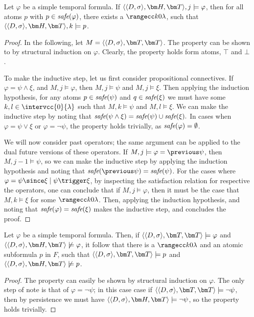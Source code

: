 \begin{lemma}\label{lemma1}
  Let $\varphi$ be a simple temporal formula. If
  $\qthandt,j \models \varphi$, then for all atoms $p$ with
  $p \in \textit{safe}(\varphi)$, there exists a $\kinlambda$, such that
  $\qthandt,k \models p$.
\end{lemma}
\begin{proof}
  In the following, let $M=\qttandt$. The property can be shown to by
  structural induction on $\varphi$. Clearly, the property holds form
  atoms, $\top$ and $\bot$.

To make the inductive step, let us first consider propositional
connectives. If $\varphi = \psi \wedge \xi$, and $M,j \models
\varphi$, then $M,j \models \psi$ and $M,j \models \xi$. Then applying
the induction hypothesis, for any atoms $p \in \textit{safe}(\psi)$ and $q \in
\textit{safe}(\xi)$ we must have some $k,l \in \intervcc{0}{\lambda}$ such
that $M,k \models \psi$ and $M,l \models \xi$. We can make the
inductive step by noting that $\textit{safe}(\psi \wedge \xi) = \textit{safe}(\psi)
\cup \textit{safe}(\xi).$ In cases when $\varphi = \psi \vee \xi$ or $\varphi
= \neg \psi$, the property holds trivially, as $\textit{safe}(\varphi) =
\emptyset$.

We will now consider past operators; the same argument can be applied
to the dual future versions of these operators. If
$M,j \models \varphi = \previous \psi$, then $M,j-1 \models \psi$, so
we can make the inductive step by applying the induction hypothesis
and noting that $\safe{\previous \psi} = \safe{\psi}$. For the cases
where $\varphi = \psi \since \xi \mid \psi \trigger \xi$, by
inspecting the satisfaction relation for respective the operators, one
can conclude that if $M,j \models \varphi$, then it must be the case
that $M,k \models \xi$ for some $\kinlambda$. Then, applying the
induction hypothesis, and noting that $\textit{safe}(\varphi) = \textit{safe}(\xi)$
makes the inductive step, and concludes the proof.
  
\end{proof}

\begin{lemma}\label{lemma2}
  Let $\varphi$ be a simple temporal formula. Then, if
  $\qttandt \models \varphi$ and $\qthandt \not\models \varphi$, it
  follow that there is a $\kinlambda$ and an atomic subformula $p$ in
  $F$, such that $\qttandt \models p$ and
  $\qthandt \not\models p$.
\end{lemma}
\begin{proof}
  The property can easily be shown by structural induction on
  $\varphi$. The only step of note is that of $\varphi = \neg \psi$;
  in this case case if $\qttandt \models \neg \psi$, then by
  persistence we must have $\qthandt \models \neg \psi$, so the
  property holds trivially.
\end{proof}



